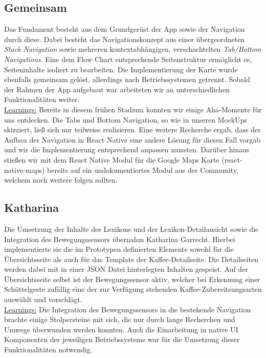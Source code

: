 \subsection{Gemeinsam}
Das Fundament besteht aus dem Grundgerüst der App sowie der Navigation durch diese.
Dabei besteht das Navigationskonzept aus einer übergeordneten \emph{Stack Navigation} sowie mehreren kontextabhängigen, verschachtelten \emph{Tab/Bottom Navigations}.
Eine dem Flow Chart entsprechende Seitenstruktur ermöglicht es, Seiteninhalte isoliert zu bearbeiten.
Die Implementierung der Karte wurde ebenfalls gemeinsam gelöst, allerdings nach Betriebssystemen getrennt.
Sobald der Rahmen der App aufgebaut war arbeiteten wir an unterschiedlichen Funktionalitäten weiter.
\\
\underline{Learnings:}
Bereits in diesem frühen Stadium konnten wir einige Aha-Momente für uns entdecken.
Die Tabs und Bottom Navigation, so wie in unseren MockUps skizziert, ließ sich nur teilweise realisieren.
Eine weitere Recherche ergab, dass der Aufbau der Navigation in React Native eine andere Lösung für diesen Fall vorgab und wir die Implementierung entsprechend anpassen mussten.
Darüber hinaus stießen wir mit dem React Native Modul für die Google Maps Karte (react-native-maps) bereits auf ein undokumentiertes Modul aus der Community, welchem noch weitere folgen sollten.

\subsection{Katharina}
Die Umsetzung der Inhalte des Lexikons und der Lexikon-Detailansicht sowie die Integration des Bewegungssensors übernahm Katharina Garrecht.
Hierbei implementierte sie die im Prototypen definierten Elemente sowohl für die Übersichtsseite als auch für das Template der Kaffee-Detailseite.
Die Detailseiten werden dabei mit in einer JSON Datei hinterlegten Inhalten gespeist.
Auf der Übersichtsseite selbst ist der Bewegungssensor aktiv, welcher bei Erkennung einer Schüttelgeste zufällig eine der zur Verfügung stehenden Kaffee-Zubereitsungsarten auswählt und vorschlägt.
\\
\underline{Learnings:}
Die Integration des Bewegungssensors in die bestehende Navigation brachte einige Stolpersteine mit sich, die nur durch lange Recherchen und Umwege überwunden werden konnten.
Auch die Einarbeitung in native UI Komponenten der jeweiligen Betriebssysteme war für die Umsetzung dieser Funktionalitäten notwendig.

